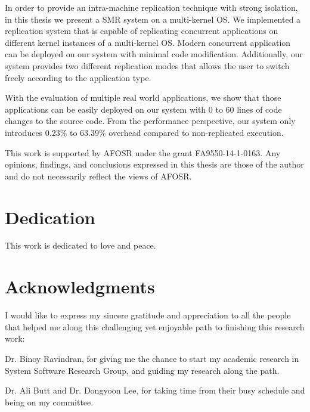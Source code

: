 \documentclass[12pt]{report}
\begin{document}
In order to provide an intra-machine replication technique with strong isolation, in this thesis we present a SMR system on a multi-kernel OS. We implemented a replication system that is capable of replicating concurrent applications on different kernel instances of a multi-kernel OS. Modern concurrent application can be deployed on our system with minimal code modification. Additionally, our system provides two different replication modes that allows the user to switch freely according to the application type.

With the evaluation of multiple real world applications, we show that those applications can be easily deployed on our system with 0 to 60 lines of code changes to the source code. From the performance perspective, our system only introduces 0.23\% to 63.39\% overhead compared to non-replicated execution. 

\vfill


This work is supported by AFOSR under the grant FA9550-14-1-0163.  Any opinions, findings, and conclusions expressed in this thesis are those of the author and do not necessarily reflect the views of AFOSR.

\pagebreak

\chapter*{Dedication}
This work is dedicated to love and peace.

\chapter*{Acknowledgments}
I would like to express my sincere gratitude and appreciation to all the people that helped me along this challenging yet enjoyable path to finishing this research work:

Dr. Binoy Ravindran, for giving me the chance to start my academic research in System Software Research Group, and guiding my research along the path.

Dr. Ali Butt and Dr. Dongyoon Lee, for taking time from their busy schedule and being on my committee.
\end{document}
